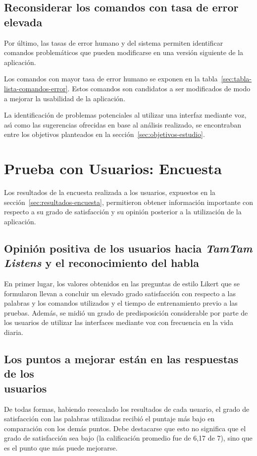 \subsection{Reconsiderar los comandos con tasa de error elevada}
Por \'ultimo, las tasas de error humano y del sistema permiten identificar comandos 
problem\'aticos que pueden modificarse en una versi\'on siguiente de la aplicaci\'on.

Los comandos con mayor tasa de error humano se exponen en la tabla~\ref{sec:tabla-lista-comandos-error}.
Estos comandos son candidatos a ser modificados de modo a mejorar la usabilidad de la
aplicaci\'on.

La identificaci\'on de problemas potenciales al utilizar una interfaz mediante voz, as{\'\i} como 
las sugerencias ofrecidas en base al an\'alisis realizado, se encontraban entre los objetivos planteados 
en la secci\'on~\ref{sec:objetivos-estudio}.

\section{Prueba con Usuarios: Encuesta}
Los resultados de la encuesta realizada a los usuarios, expuestos en la secci\'on~\ref{sec:resultados-encuesta},
permitieron obtener informaci\'on importante con respecto a su grado de satisfacci\'on y su opini\'on 
posterior a la utilizaci\'on de la aplicaci\'on.

\subsection[Opini\'on positiva de los usuarios hacia \emph{TamTam Listens} y el \\ reconocimiento del habla]
{Opini\'on positiva de los usuarios hacia \emph{TamTam Listens} y el reconocimiento del habla}
En primer lugar, los valores obtenidos en las preguntas de estilo Likert que se formularon
llevan a concluir un elevado grado satisfacci\'on con respecto a las palabras y los comandos
utilizados y el tiempo de entrenamiento previo a las pruebas.
Adem\'as, se midi\'o un grado de predisposici\'on considerable por parte de los usuarios de utilizar
las interfaces mediante voz con frecuencia en la vida diaria.

\subsection[Los puntos a mejorar est\'an en las respuestas de los usuarios]
{Los puntos a mejorar est\'an en las respuestas de los \\ usuarios}
De todas formas, habiendo reescalado los resultados de cada usuario, el grado de satisfacci\'on
con las palabras utilizadas recibi\'o el puntaje m\'as bajo en comparaci\'on con los dem\'as puntos.
Debe destacarse que esto no significa que el grado de satisfacci\'on sea bajo (la calificaci\'on promedio
fue de 6,17 de 7), sino que es el punto que m\'as puede mejorarse.

